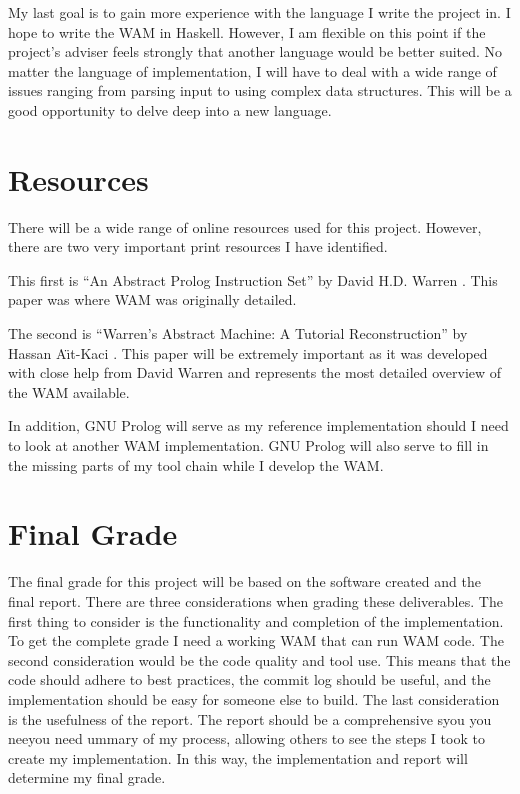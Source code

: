 \documentclass{article}
\begin{document}
My last goal is to gain more experience with the language I write the project in. I hope to write the WAM in Haskell. However, I am flexible on this point if the project's adviser feels strongly that another language would be better suited. No matter the language of implementation, I will have to deal with a wide range of issues ranging from parsing input to using complex data structures. This will be a good opportunity to delve deep into a new language. 

\section{Resources}
There will be a wide range of online resources used for this project. However, there are two very important print resources I have identified.

This first is ``An Abstract Prolog Instruction Set'' by David H.D. Warren \cite{AICPub641:1983}. This paper was where WAM was originally detailed. 

The second is ``Warren's Abstract Machine: A Tutorial Reconstruction'' by Hassan A\"{\i}t-Kaci \cite{Ait-Kaci:1991:WAM:113900}. This paper will be extremely important as it was developed with close help from David Warren and represents the most detailed overview of the WAM available. 

In addition, GNU Prolog will serve as my reference implementation should I need to look at another WAM implementation. GNU Prolog will also serve to fill in the missing parts of my tool chain while I develop the WAM. 

\section{Final Grade}
The final grade for this project will be based on the software created and the final report. There are three considerations when grading these deliverables. The first thing to consider is the functionality and completion of the implementation. To get the complete grade I need a working WAM that can run WAM code. The second consideration would be the code quality and tool use. This means that the code should adhere to best practices, the commit log should be useful, and the implementation should be easy for someone else to build. The last consideration is the usefulness of the report. The report should be a comprehensive syou you neeyou need ummary of my process, allowing others to see the steps I took to create my implementation. In this way, the implementation and report will determine my final grade. 





\end{document}
